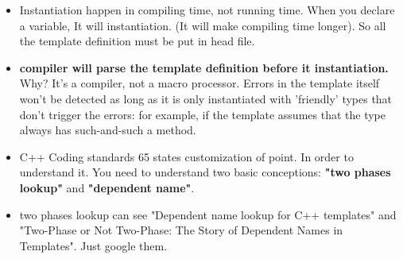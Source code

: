 \documentclass[a4paper,11pt,twoside]{book}
\begin{document}
\begin{itemize}
\item Instantiation happen in compiling time, not running time. When you declare a variable, It will instantiation. (It will make compiling time longer). So all the template definition must be put in head file. 
	
\item \textbf{compiler will parse the template definition before it instantiation.} Why? It's a compiler, not a macro processor. Errors in the template itself won't be detected as long as it is only instantiated with 'friendly' types that don't trigger the errors: for example, if the template assumes that the type always has such-and-such a method.

\item C++ Coding standards 65 states customization of point. In order to understand it. You need to understand two basic conceptions: \textbf{"two phases lookup"} and \textbf{"dependent name"}.  

\item two phases lookup can see "Dependent name lookup for C++ templates" and "Two-Phase or Not Two-Phase: The Story of Dependent Names in Templates". Just google them.
\end{itemize}
\end{document}
